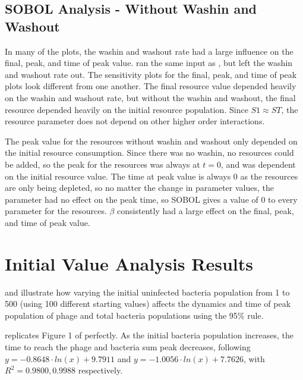 \subsection{SOBOL Analysis - Without Washin and Washout}
In many of the plots, the washin and washout rate had a large influence on the final, peak, and time of peak value. 
 ran the same input as , but left the washin and washout rate out. 
The sensitivity plots for the final, peak, and time of peak plots look different from one another. 
The final resource value depended heavily on the washin and washout rate, but without the washin and washout, the final resource depended heavily on the initial resource population. 
Since $S1 \approx ST$, the resource parameter does not depend on other higher order interactions. 

The peak value for the resources without washin and washout only depended on the initial resource consumption. 
Since there was no washin, no resources could be added, so the peak for the resources was always at $t=0$, and was dependent on the initial resource value. 
The time at peak value is always 0 as the resources are only being depleted, so no matter the change in parameter values, the parameter had no effect on the peak time, so SOBOL gives a value of 0 to every parameter for the resources. 
$\beta$ consistently had a large effect on the final, peak, and time of peak value. 


\section{Initial Value Analysis Results}
\label{sec:results:initial_value_analysis}

 and  illustrate how varying the initial uninfected bacteria population from 1 to 500 (using 100 different starting values) affects the dynamics and time of peak population of phage and total bacteria populations using the 95\% rule. 

 replicates  Figure 1 of \citet{mullaExtremeDiversityPhage2024} perfectly. 
As the initial bacteria population increases, the time to reach the phage and bacteria sum peak decreases, following $y = -0.8648\cdot ln(x) + 9.7911$ and $y = -1.0056\cdot ln(x)+7.7626$, with $R^2=0.9800, 0.9988$ respectively. 

